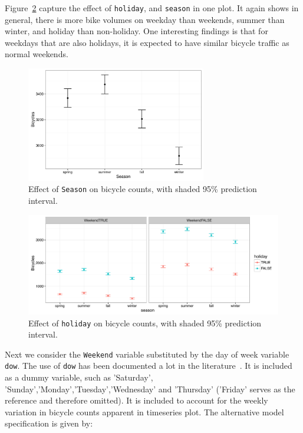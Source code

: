 \documentclass [11pt, proquest] {uwthesis}[2015/03/03]
\begin{document}
Figure~\ref{fig:multi} capture the effect of \texttt{holiday},  and \texttt{season} in one plot. It again shows in general, there is more bike volumes on weekday than weekends, summer than winter, and holiday than non-holiday. One interesting findings is that for weekdays that are also holidays, it is expected to have similar bicycle traffic as normal weekends. 

\begin{figure}
\centering
  \includegraphics[width=0.7\textwidth]{figures/sim/season} 
 \caption{Effect of \texttt{Season} on bicycle counts, with shaded 95\% prediction interval.}
 \label{fig:season}
\end{figure}

\begin{figure}
\centering
  \includegraphics[width=1\textwidth]{figures/sim/multi} 
 \caption{Effect of \texttt{holiday} on bicycle counts, with shaded 95\% prediction interval.}
 \label{fig:multi}
\end{figure}

Next we consider the \texttt{Weekend} variable substituted by the day of week variable \texttt{dow}. The use of \texttt{dow} has been documented a lot in the literature~\cite{Miranda-Moreno:2011aa,Ahmed12}. It is included as a dummy variable, such as 'Saturday', 'Sunday','Monday','Tuesday','Wednesday' and 'Thursday' ('Friday' serves as the reference and therefore omitted). It is included to account for the weekly variation in bicycle counts apparent in timeseries plot. The alternative model specification is given by:
\end{document}
